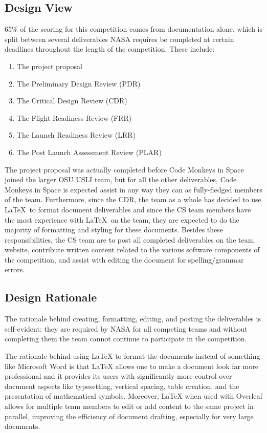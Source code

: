 \documentclass[onecolumn, draftclsnofoot,10pt, compsoc]{IEEEtran}
\begin{document}
\subsection{Design View}
65\% of the scoring for this competition comes from documentation alone, which is split between several deliverables NASA requires be completed at certain deadlines throughout the length of the competition. These include:
\begin{enumerate}
\item The project proposal
\item The Preliminary Design Review (PDR)
\item The Critical Design Review (CDR)
\item The Flight Readiness Review (FRR)
\item The Launch Readiness Review (LRR)
\item The Post Launch Assessment Review (PLAR)
\end{enumerate}
The project proposal was actually completed before Code Monkeys in Space joined the larger OSU USLI team, but for all the other deliverables, Code Monkeys in Space is expected assist in any way they can as fully-fledged members of the team. Furthermore, since the CDR, the team as a whole has decided to use \LaTeX~to format document deliverables and since the CS team members have the most experience with \LaTeX~on the team, they are expected to do the majority of formatting and styling for these documents. Besides these responsibilities, the CS team are to post all completed deliverables on the team website, contribute written content related to the various software components of the competition, and assist with editing the document for spelling/grammar errors.
\subsection{Design Rationale}
The rationale behind creating, formatting, editing, and posting the deliverables is self-evident: they are required by NASA for all competing teams and without completing them the team cannot continue to participate in the competition. 

The rationale behind using LaTeX to format the documents instead of something like Microsoft Word is that LaTeX allows one to make a document look far more professional and it provides its users with significantly more control over document aspects like typesetting, vertical spacing, table creation, and the presentation of mathematical symbols. Moreover, LaTeX when used with Overleaf allows for multiple team members to edit or add content to the same project in parallel, improving the efficiency of document drafting, especially for very large documents.
\end{document}
